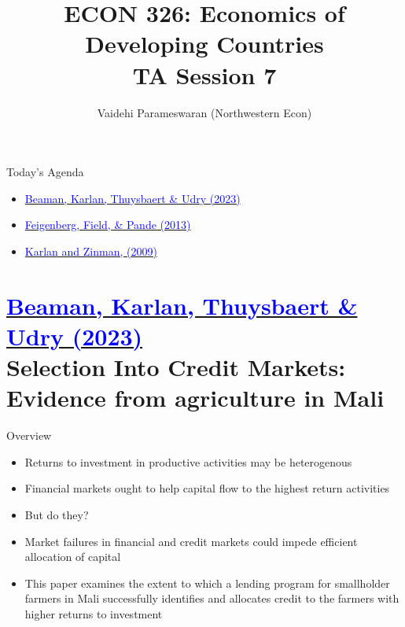 \documentclass[11pt,notes=hide,aspectratio=169,mathserif]{beamer}
\title[class]{ECON 326: Economics of Developing Countries \\ TA Session 7}
\author[vaidehi's class ]{Vaidehi Parameswaran (Northwestern Econ)}
\date{\monthname[\the\month] \the\year}
\begin{document}
\begin{frame}[plain]
\titlepage
\end{frame}


\begin{frame}{Today's Agenda}

\begin{itemize}
\item \href{https://onlinelibrary-wiley-com.turing.library.northwestern.edu/doi/epdf/10.3982/ECTA18916}{\textcolor{blue}{Beaman, Karlan, Thuysbaert \& Udry (2023)}}
\item \href{https://www.nber.org/system/files/working_papers/w16018/w16018.pdf}{\textcolor{blue}{Feigenberg, Field, \& Pande (2013)}}
\item \href{https://onlinelibrary.wiley.com/doi/abs/10.3982/ECTA5781}{\textcolor{blue}{Karlan and Zinman, (2009)}}
\end{itemize}
\end{frame}

\section*{\href{https://onlinelibrary-wiley-com.turing.library.northwestern.edu/doi/epdf/10.3982/ECTA18916}{\textcolor{blue}{Beaman, Karlan, Thuysbaert \& Udry (2023)}} \\[5mm] 
\textnormal{\small{Selection Into Credit Markets: Evidence from agriculture in  Mali}}}

\begin{frame}{Overview}

\begin{itemize}
\item Returns to investment in productive activities may be heterogenous
\pause \item Financial markets ought to help capital flow to the highest return activities
\pause \item But do they?
\pause \item Market failures in financial and credit markets could impede efficient allocation of capital
\pause \item This paper examines the extent to which a lending program for smallholder farmers in Mali successfully identifies and allocates credit to the farmers with higher returns to investment
\end{itemize}
\end{frame}
\end{document}
